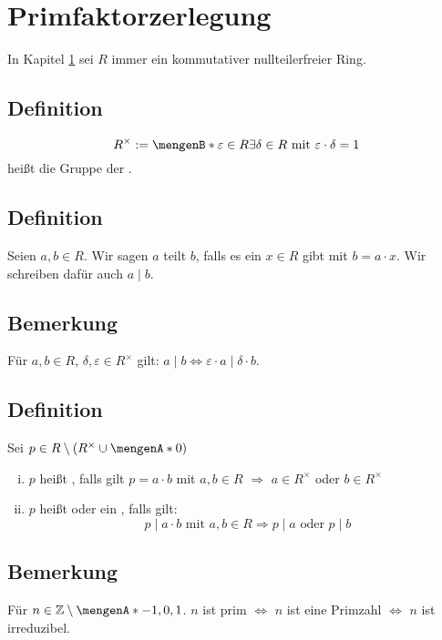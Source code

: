 \section{Primfaktorzerlegung} %
\label{sec:7}
In Kapitel \ref{sec:7} sei $R$ immer ein kommutativer nullteilerfreier Ring.

\subsection[Definition: Gruppe der Einheiten]{Definition} %
\label{sub:71}
\[
	R^\times := \set[\varepsilon \in R]{\exists \delta \in R \text{ mit } \varepsilon \cdot \delta = 1} 
\]
heißt die Gruppe der . 

\subsection[Definition: Teiler]{Definition} %
\label{sub:72}
Seien $a,b\in R$. Wir sagen $a$ teilt $b$, falls es ein $x \in R$ gibt mit $b = a \cdot x$. Wir schreiben dafür auch $a \mid b$.

\subsection[Bemerkung: Multiplikation mit Einheiten hat keinen Einfluss auf Teilbarkeit]{Bemerkung} %
\label{sub:73}
Für $a,b \in R$, $\delta , \varepsilon \in R^\times$ gilt: $a \mid b \iff \varepsilon \cdot a \mid \delta \cdot b$.

\subsection[Definition: irreduzible Elemente und Primelemente in Ringen]{Definition} %
\label{sub:74}
Sei $p \in R \setminus \enbrace{R^\times \cup \set{0} } $
\begin{enumerate}[i)]
	\item $p$ heißt , falls gilt $p= a \cdot b$ mit $a,b \in R$ $\Longrightarrow$ $a \in R^\times$ oder $b \in R^\times$
	\item $p$ heißt   oder ein , falls gilt:
	\[
		p \mid a \cdot b \text{ mit } a,b \in R \Longrightarrow p \mid a \text{ oder } p \mid b
	\] 
\end{enumerate}

\subsection[Bemerkung: Primelemente in $\mathds{Z}$]{Bemerkung} %
\label{sub:75}
Für $n \in \mathds{Z} \setminus \set{-1,0,1} $. $n$ ist prim $\Leftrightarrow$ $n$ ist eine Primzahl $\iff$ $n$ ist irreduzibel.

